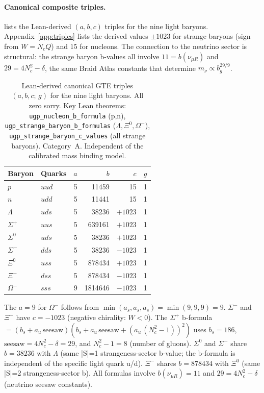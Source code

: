 \documentclass[11pt]{article}
\theoremstyle{remark}
\begin{document}
\paragraph{Canonical composite triples.}
 lists the Lean-derived $(a,b,c)$ triples
for the nine light baryons.
Appendix~\ref{app:triples} lists the derived values $\pm 1023$ for strange baryons (sign from $W = N_c Q$)
and $15$ for nucleons.
The connection to the neutrino sector is structural: the strange baryon b-values
all involve $11 = b(\nu_{\mu R})$ and $29 = 4N_c^2-\delta$,
the same Braid Atlas constants that determine $m_\nu \propto b_g^{29/9}$.

\begin{table}[H]
\centering
\caption{Lean-derived canonical GTE triples $(a,b,c;\,g)$ for the nine light baryons.
  All zero sorry. Key Lean theorems: \texttt{ugp\_nucleon\_b\_formula} (p,n),
  \texttt{ugp\_strange\_baryon\_b\_formulas} ($\Lambda, \Xi^0, \Omega^-$),
  \texttt{ugp\_strange\_baryon\_c\_values} (all strange baryons).
  Category~A. Independent of the calibrated mass binding model.}
\label{tab:composite_triples}
\small
\renewcommand{\arraystretch}{1.05}
\begin{tabular}{@{}llrrrl@{}}
\toprule
\textbf{Baryon} & \textbf{Quarks} & $a$ & $b$ & $c$ & $g$ \\
\midrule
$p$          & $uud$ & 5 & 11459 & 15    & 1 \\
$n$          & $udd$ & 5 & 11441 & 15    & 1 \\
$\Lambda$    & $uds$ & 5 & 38236   & $+1023$ & 1 \\
$\Sigma^+$   & $uus$ & 5 & 639161  & $+1023$ & 1 \\
$\Sigma^0$   & $uds$ & 5 & 38236   & $+1023$ & 1 \\
$\Sigma^-$   & $dds$ & 5 & 38236   & $-1023$ & 1 \\
$\Xi^0$      & $uss$ & 5 & 878434  & $+1023$ & 1 \\
$\Xi^-$      & $dss$ & 5 & 878434  & $-1023$ & 1 \\
$\Omega^-$   & $sss$ & 9 & 1814646 & $-1023$ & 1 \\
\bottomrule
\end{tabular}
\footnotesize\par\vspace{2pt}
The $a=9$ for $\Omega^-$ follows from $\min(a_s,a_s,a_s) = \min(9,9,9) = 9$.
$\Sigma^-$ and $\Xi^-$ have $c=-1023$ (negative chirality: $W<0$).
The $\Sigma^+$ b-formula $= (b_s + a_u\,\mathrm{seesaw})(b_s + a_u\,\mathrm{seesaw} + (a_u\,(N_c^2{-}1))^2)$
uses $b_s=186$, $\mathrm{seesaw}=4N_c^2{-}\delta=29$, and $N_c^2{-}1=8$ (number of gluons).
$\Sigma^0$ and $\Sigma^-$ share $b=38236$ with $\Lambda$ (same |S|=1 strangeness-sector b-value;
the b-formula is independent of the specific light quark u/d).
$\Xi^-$ shares $b=878434$ with $\Xi^0$ (same |S|=2 strangeness-sector b).
All formulas involve $b(\nu_{\mu R})=11$ and $29=4N_c^2{-}\delta$ (neutrino seesaw constants).
\end{table}
\end{document}
